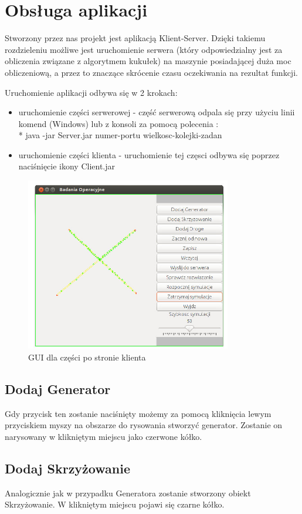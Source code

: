 \documentclass{article}
\begin{document}
\section{Obsługa aplikacji}
  Stworzony przez nas projekt jest aplikacją Klient-Server. Dzięki takiemu rozdzieleniu możliwe jest uruchomienie serwera (który odpowiedzialny jest za obliczenia związane z algorytmem kukułek) na maszynie posiadającej duża moc obliczeniową, a przez to znaczące skrócenie czasu oczekiwania na rezultat funkcji.

Uruchomienie aplikacji odbywa się w 2 krokach:
\begin{itemize}
\item uruchomienie części serwerowej - część serwerową odpala się przy użyciu linii komend (Windows) lub z konsoli za pomocą polecenia :\\*
 java -jar Server.jar numer-portu wielkosc-kolejki-zadan
\item uruchomienie części klienta - uruchomienie tej częsci odbywa się poprzez naciśnięcie ikony Client.jar
\end{itemize}

\begin{figure}[ht!]
\centering
\includegraphics[width=90mm]{gui.jpg}
\caption{GUI dla części po stronie klienta}
\label{overflow}
\end{figure}

\subsection{Dodaj Generator}
    Gdy przycisk ten zostanie naciśnięty możemy za pomocą kliknięcia lewym przyciskiem myszy na obszarze do rysowania stworzyć generator. Zostanie on narysowany w klikniętym miejscu jako czerwone kółko.

\subsection{Dodaj Skrzyżowanie}
    Analogicznie jak w przypadku Generatora zostanie stworzony obiekt Skrzyżowanie. W klikniętym miejscu pojawi się czarne kółko.
\end{document}

